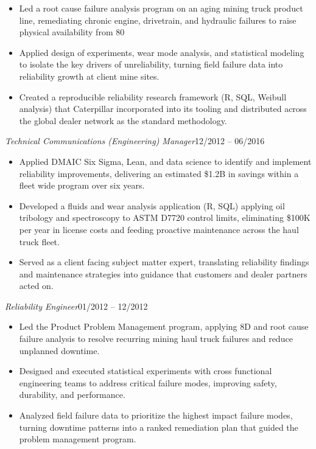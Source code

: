 \documentclass[10pt]{article}
\newcommand{\roledated}[2]{%
  \textit{#1}\hfill{\color{slate}\small #2}\par\vspace{1pt}}
\begin{document}
\begin{itemize}
    \item Led a root cause failure analysis program on an aging mining truck product line, remediating chronic engine, drivetrain, and hydraulic failures to raise physical availability from 80%
    \item Applied design of experiments, wear mode analysis, and statistical modeling to isolate the key drivers of unreliability, turning field failure data into reliability growth at client mine sites.
    \item Created a reproducible reliability research framework (R, SQL, Weibull analysis) that Caterpillar incorporated into its tooling and distributed across the global dealer network as the standard methodology.
\end{itemize}

\roledated{Technical Communications (Engineering) Manager}{12/2012 -- 06/2016}
\begin{itemize}
    \item Applied DMAIC Six Sigma, Lean, and data science to identify and implement reliability improvements, delivering an estimated \$1.2B in savings within a fleet wide program over six years.
    \item Developed a fluids and wear analysis application (R, SQL) applying oil tribology and spectroscopy to ASTM D7720 control limits, eliminating \$100K per year in license costs and feeding proactive maintenance across the haul truck fleet.
    \item Served as a client facing subject matter expert, translating reliability findings and maintenance strategies into guidance that customers and dealer partners acted on.
\end{itemize}

\roledated{Reliability Engineer}{01/2012 -- 12/2012}
\begin{itemize}
    \item Led the Product Problem Management program, applying 8D and root cause failure analysis to resolve recurring mining haul truck failures and reduce unplanned downtime.
    \item Designed and executed statistical experiments with cross functional engineering teams to address critical failure modes, improving safety, durability, and performance.
    \item Analyzed field failure data to prioritize the highest impact failure modes, turning downtime patterns into a ranked remediation plan that guided the problem management program.
\end{itemize}
\end{document}
